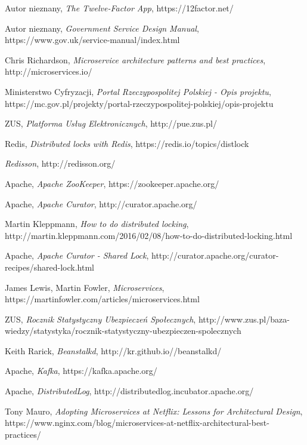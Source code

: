 \documentclass[licencjacka]{pracamgr}
\begin{document}
\begin{thebibliography}{99}

 Autor nieznany, \textit{The Twelve-Factor App}, https://12factor.net/

 Autor nieznany, \textit{Government Service Design Manual},
https://www.gov.uk/service-manual/index.html

 Chris Richardson, \textit{Microservice architecture patterns and best practices},
http://microservices.io/

 Ministerstwo Cyfryzacji, \textit{Portal Rzeczypospolitej Polskiej - Opis projektu},
https://mc.gov.pl/projekty/portal-rzeczypospolitej-polskiej/opis-projektu

 ZUS, \textit{Platforma Usług Elektronicznych},
http://pue.zus.pl/

 Redis, \textit{Distributed locks with Redis},
https://redis.io/topics/distlock

 \textit{Redisson},
http://redisson.org/

 Apache, \textit{Apache ZooKeeper},
https://zookeeper.apache.org/

 Apache, \textit{Apache Curator},
http://curator.apache.org/

 Martin Kleppmann, \textit{How to do distributed locking},
http://martin.kleppmann.com/2016/02/08/how-to-do-distributed-locking.html

 Apache, \textit{Apache Curator - Shared Lock},
http://curator.apache.org/curator-recipes/shared-lock.html

 James Lewis, Martin Fowler, \textit{Microservices},
https://martinfowler.com/articles/microservices.html

 ZUS, \textit{Rocznik Statystyczny Ubezpieczeń Społecznych},
http://www.zus.pl/baza-wiedzy/statystyka/rocznik-statystyczny-ubezpieczen-spolecznych

 Keith Rarick, \textit{Beanstalkd},
http://kr.github.io//beanstalkd/

 Apache, \textit{Kafka},
https://kafka.apache.org/

 Apache, \textit{DistributedLog},
http://distributedlog.incubator.apache.org/

 Tony Mauro, \textit{Adopting Microservices at Netflix: Lessons for Architectural Design},
https://www.nginx.com/blog/microservices-at-netflix-architectural-best-practices/

\end{thebibliography}
\end{document}
